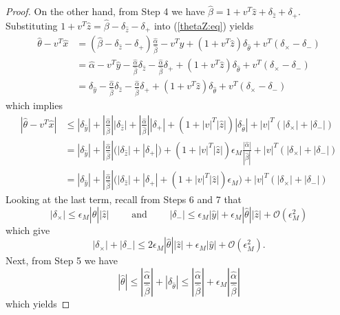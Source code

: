 \documentclass{siamltex}
\newcommand{\eqnref}[1]{(\ref{#1})}
\newcommand{\eps}{\epsilon}
\begin{document}
\begin{proof}
On the other hand, from Step 4 we have $\hat \beta = 1 + v^T \hat z + \delta_{\hat z} + \delta_{+}$. Substituting $1 + v^T \hat z = \hat \beta -  \delta_{\hat z} - \delta_{+}$ into \eqnref{thetaZ:eq} yields
\begin{align}
\hat \theta - v^T \hat x &= (\hat \beta -  \delta_{\hat z} - \delta_{+}) \frac{\hat \alpha}{\hat \beta} - v^T \hat y + (1 + v^T \hat z) \delta_{\hat \theta} + v^T (\delta_{\times} -  \delta_{-}) \nonumber \\
& = \hat \alpha - v^T \hat y - \frac{\hat \alpha}{\hat \beta} \delta_{\hat z}  - \frac{\hat \alpha}{\hat \beta} \delta_{+} + (1 + v^T \hat z) \delta_{\hat \theta} + v^T (\delta_{\times} -  \delta_{-}) \nonumber \\
& = \delta_{\hat y} - \frac{\hat \alpha}{\hat \beta} \delta_{\hat z}  - \frac{\hat \alpha}{\hat \beta} \delta_{+} + (1 + v^T \hat z) \delta_{\hat \theta} + v^T (\delta_{\times} -  \delta_{-}) \label{theta_minus_vx:eq}
\end{align}
which implies
\begin{align}
|\hat \theta - v^T \hat x| & \leq |\delta_{\hat y}| + |\frac{\hat \alpha}{\hat \beta}| |\delta_{\hat z}|  + |\frac{\hat \alpha}{\hat \beta}| |\delta_{+}| + (1 + |v|^T |\hat z|) |\delta_{\hat \theta}| + |v|^T (|\delta_{\times}| + |\delta_{-}|) \nonumber \\
& =  |\delta_{\hat y}| + |\frac{\hat \alpha}{\hat \beta}| \big( |\delta_{\hat z}|  + |\delta_{+}| \big) + (1 + |v|^T |\hat z|) \eps_M \frac{|\hat \alpha|}{|\hat \beta|} + |v|^T (|\delta_{\times}| + |\delta_{-}|) \nonumber\\
& =  |\delta_{\hat y}| + |\frac{\hat \alpha}{\hat \beta}| \Big( |\delta_{\hat z}|  + |\delta_{+}| + (1 + |v|^T |\hat z|) \eps_M \Big) + |v|^T (|\delta_{\times}| + |\delta_{-}|) 
\label{thetaZ2:eq}
\end{align}
Looking at the last term, recall from Steps 6 and 7 that
\[
|\delta_{\times}| \leq \eps_M |\hat \theta| |\hat z| \qquad \mbox{ and } \qquad
|\delta_-| \leq \eps_M |\hat y| + \eps_M |\hat \theta| |\hat z| + \mathcal{O}(\eps_M^2)
\]
which give
\[
|\delta_{\times}| + |\delta_-| \leq 2 \eps_M |\hat \theta| |\hat z|  + \eps_M |\hat y| +  \mathcal{O}(\eps_M^2).
\]
Next, from Step 5 we have
\begin{equation} \label{thetaHatBnd:eq}
|\hat \theta|  \leq  |\frac{\hat \alpha}{\hat \beta}| + |\delta_{\hat \theta}| 
\leq  |\frac{\hat \alpha}{\hat \beta}| + \eps_M  |\frac{\hat \alpha}{\hat \beta}|
\end{equation}
which yields

\end{proof}
\end{document}
